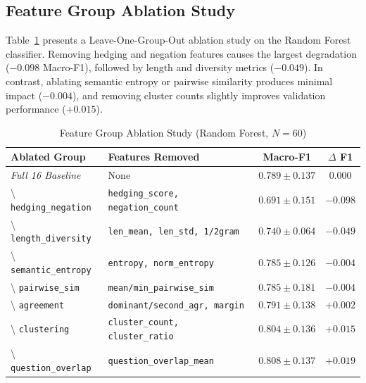 \documentclass[conference]{IEEEtran}
\begin{document}
\subsection{Feature Group Ablation Study}
Table~\ref{tab:ablation} presents a Leave-One-Group-Out ablation study on the Random Forest classifier. Removing hedging and negation features causes the largest degradation ($-0.098$ Macro-F1), followed by length and diversity metrics ($-0.049$). In contrast, ablating semantic entropy or pairwise similarity produces minimal impact ($-0.004$), and removing cluster counts slightly improves validation performance ($+0.015$).

\begin{table}[t]
\caption{Feature Group Ablation Study (Random Forest, $N=60$)}
\label{tab:ablation}
\centering
\begin{tabularx}{\columnwidth}{lXcc}
\toprule
\textbf{Ablated Group} & \textbf{Features Removed} & \textbf{Macro-F1} & \textbf{$\Delta$ F1} \\
\midrule
\textit{Full 16 Baseline} & None & $\mathbf{0.789 \pm 0.137}$ & $0.000$ \\
$\setminus$ \texttt{hedging\_negation} & \texttt{hedging\_score, negation\_count} & $0.691 \pm 0.151$ & $\mathbf{-0.098}$ \\
$\setminus$ \texttt{length\_diversity} & \texttt{len\_mean, len\_std, 1/2gram} & $0.740 \pm 0.064$ & $\mathbf{-0.049}$ \\
$\setminus$ \texttt{semantic\_entropy} & \texttt{entropy, norm\_entropy} & $0.785 \pm 0.126$ & $-0.004$ \\
$\setminus$ \texttt{pairwise\_sim} & \texttt{mean/min\_pairwise\_sim} & $0.785 \pm 0.181$ & $-0.004$ \\
$\setminus$ \texttt{agreement} & \texttt{dominant/second\_agr, margin} & $0.791 \pm 0.138$ & $+0.002$ \\
$\setminus$ \texttt{clustering} & \texttt{cluster\_count, cluster\_ratio} & $0.804 \pm 0.136$ & $+0.015$ \\
$\setminus$ \texttt{question\_overlap} & \texttt{question\_overlap\_mean} & $0.808 \pm 0.137$ & $+0.019$ \\
\bottomrule
\end{tabularx}
\end{table}
\end{document}
